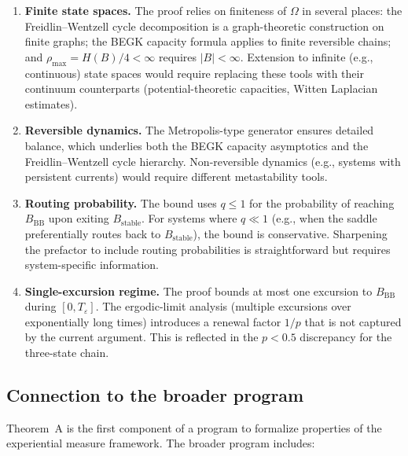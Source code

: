 \documentclass[11pt]{article}
\newcommand{\eps}{\varepsilon}
\newcommand{\Bstable}{B_{\mathrm{stable}}}
\newcommand{\BBB}{B_{\mathrm{BB}}}
\newcommand{\Teps}{T_\eps}
\begin{document}
\begin{enumerate}
\item \textbf{Finite state spaces.}  The proof relies on finiteness
  of $\Omega$ in several places: the Freidlin--Wentzell cycle
  decomposition is a graph-theoretic construction on finite graphs;
  the BEGK capacity formula applies to finite reversible chains;
  and $\rho_{\max} = H(B)/4 < \infty$ requires $|B| < \infty$.
  Extension to infinite (e.g., continuous) state spaces would require
  replacing these tools with their continuum counterparts
  (potential-theoretic capacities, Witten Laplacian estimates).

\item \textbf{Reversible dynamics.}  The Metropolis-type generator
  ensures detailed balance, which underlies both the BEGK capacity
  asymptotics and the Freidlin--Wentzell cycle hierarchy.
  Non-reversible dynamics (e.g., systems with persistent currents)
  would require different metastability tools.

\item \textbf{Routing probability.}  The bound uses $q \leq 1$ for
  the probability of reaching $\BBB$ upon exiting $\Bstable$.  For
  systems where $q \ll 1$ (e.g., when the saddle preferentially
  routes back to $\Bstable$), the bound is conservative.  Sharpening
  the prefactor to include routing probabilities is straightforward
  but requires system-specific information.

\item \textbf{Single-excursion regime.}  The proof bounds at most
  one excursion to $\BBB$ during $[0, \Teps]$.  The ergodic-limit
  analysis (multiple excursions over exponentially long times)
  introduces a renewal factor $1/p$ that is not captured by the
  current argument.  This is reflected in the $p < 0.5$ discrepancy
  for the three-state chain.
\end{enumerate}

\subsection{Connection to the broader program}

Theorem~A is the first component of a program to formalize properties
of the experiential measure framework.  The broader program includes:
\end{document}
